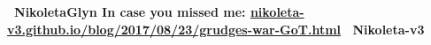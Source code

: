 \documentclass[usenames,dvipsnames,t]{beamer}
\begin{document}
\begin{frame}[fragile]
\begin{columns}
\begin{column}{.8\linewidth}
   \hspace{1cm}

\textbf{ \faTwitter \ NikoletaGlyn \hspace{2cm} In case you missed me: \url{nikoleta-v3.github.io/blog/2017/08/23/grudges-war-GoT.html} \hspace{2cm} \faGithub \ Nikoleta-v3}

\end{column}
\end{columns}

   \vspace{1cm}

\end{frame}
\end{document}
